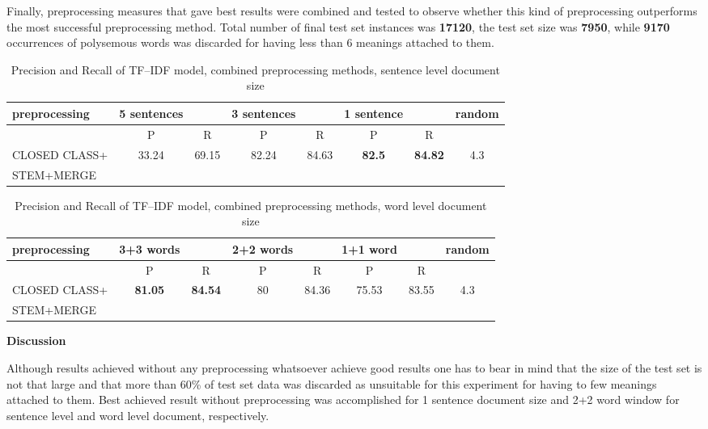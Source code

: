 Finally, preprocessing measures that gave best results were combined and tested to observe whether
this kind of preprocessing outperforms the most successful preprocessing method. Total number of final test set instances was  \textbf{17120}, the test set size was \textbf{7950}, while \textbf{9170} occurrences of polysemous words was discarded for having less than 6 meanings attached to them.

\begin{table}[h!]
\begin{tabular}{ l | c c | c c | c c | c}
   preprocessing &  5 sentences && 3 sentences && 1 sentence  && random\\
\hline
	& P  &  R & P  &  R & P  &  R &\\
\hline\hline
CLOSED CLASS+ & 33.24  & 69.15  & 82.24  & 84.63 & \textbf{82.5} & \textbf{84.82} & 4.3  \\
STEM+MERGE &&&&&&&\\
\end{tabular}
\caption{Precision and Recall of TF--IDF model, combined preprocessing methods, sentence level document size}
\end{table}

\begin{table}[h!]
\begin{tabular}{ l | c c | c c | c c | c}
   preprocessing &  3+3 words && 2+2 words && 1+1 word  && random\\
\hline\hline
	& P  &  R & P  &  R & P  &  R &\\
\hline
CLOSED CLASS+ & \textbf{81.05}  & \textbf{84.54}  & 80  & 84.36  & 75.53 & 83.55  & 4.3\\
STEM+MERGE &&&&&&&\\
\end{tabular}
\caption{Precision and Recall of TF--IDF model,  combined preprocessing methods, word level document size}
\end{table} 

\vspace{10 mm}
\textbf{Discussion}

Although results achieved without any preprocessing whatsoever achieve good results one has to bear
in mind that the size of the test set is not that large and that more than 60\% of test set data was 
discarded as unsuitable for this experiment for having to few meanings attached to them. Best achieved result without preprocessing was 
accomplished for 1 sentence document size and 2+2 word window for sentence level and word level document, respectively. 

